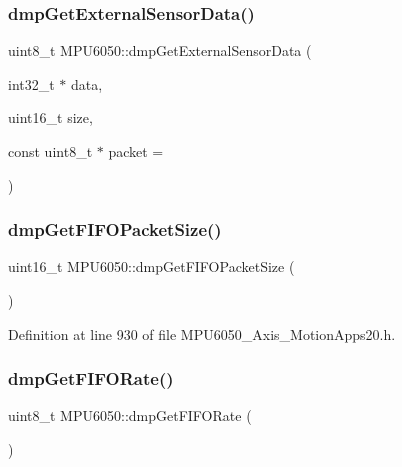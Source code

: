 \subsubsection{\texorpdfstring{dmpGetExternalSensorData()}{dmpGetExternalSensorData()}}
{\footnotesize\ttfamily uint8\+\_\+t M\+P\+U6050\+::dmp\+Get\+External\+Sensor\+Data (\begin{DoxyParamCaption}\item[{int32\+\_\+t $\ast$}]{data,  }\item[{uint16\+\_\+t}]{size,  }\item[{const uint8\+\_\+t $\ast$}]{packet = {} }\end{DoxyParamCaption})}

\mbox{\label{classMPU6050_ac91c7e1c0647a6269b890e04d2fabce9}} 
\subsubsection{\texorpdfstring{dmpGetFIFOPacketSize()}{dmpGetFIFOPacketSize()}}
{\footnotesize\ttfamily uint16\+\_\+t M\+P\+U6050\+::dmp\+Get\+F\+I\+F\+O\+Packet\+Size (\begin{DoxyParamCaption}{ }\end{DoxyParamCaption})}



Definition at line 930 of file M\+P\+U6050\+\_\+Axis\+\_\+\+Motion\+Apps20.\+h.


\begin{DoxyCode}{0}

\end{DoxyCode}
\mbox{\label{classMPU6050_abe2e585ddbb8ed4dd06287b97e399725}} 
\subsubsection{\texorpdfstring{dmpGetFIFORate()}{dmpGetFIFORate()}}
{\footnotesize\ttfamily uint8\+\_\+t M\+P\+U6050\+::dmp\+Get\+F\+I\+F\+O\+Rate (\begin{DoxyParamCaption}{ }\end{DoxyParamCaption})}

